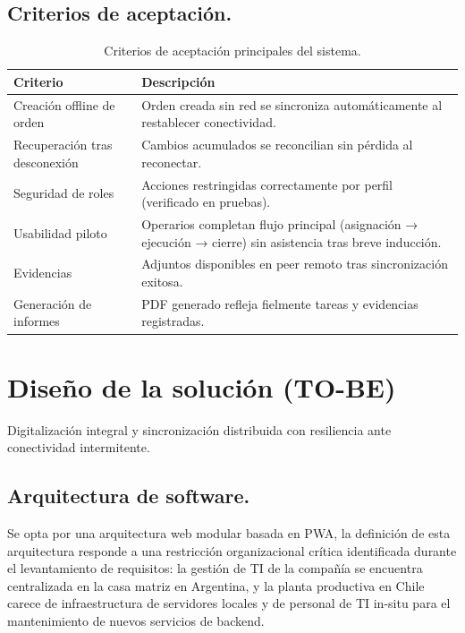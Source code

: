 \documentclass[10pt,a4paper]{report}
\begin{document}
\subsection*{Criterios de aceptación.}
\begin{table}[H]
    \centering
    \begin{tabular}{p{4cm} p{8.5cm}}
        \hline
        \textbf{Criterio} & \textbf{Descripción} \\
        \hline
        Creación offline de orden & Orden creada sin red se sincroniza automáticamente al restablecer conectividad. \\
        Recuperación tras desconexión & Cambios acumulados se reconcilian sin pérdida al reconectar. \\
        Seguridad de roles & Acciones restringidas correctamente por perfil (verificado en pruebas). \\
        Usabilidad piloto & Operarios completan flujo principal (asignación → ejecución → cierre) sin asistencia tras breve inducción. \\
        Evidencias & Adjuntos disponibles en peer remoto tras sincronización exitosa. \\
        Generación de informes & PDF generado refleja fielmente tareas y evidencias registradas. \\
        \hline
    \end{tabular}
    \caption{Criterios de aceptación principales del sistema.}
    \label{tab:criterios}
\end{table}



\section*{Diseño de la solución (TO-BE)}
Digitalización integral y sincronización distribuida con resiliencia ante conectividad intermitente.

\subsection*{Arquitectura de software.}
Se opta por una arquitectura web modular basada en PWA, la definición de esta arquitectura responde a una restricción organizacional crítica identificada durante el levantamiento de requisitos: la gestión de TI de la compañía se encuentra centralizada en la casa matriz en Argentina, y la planta productiva en Chile carece de infraestructura de servidores locales y de personal de TI in-situ para el mantenimiento de nuevos servicios de backend.
\end{document}
